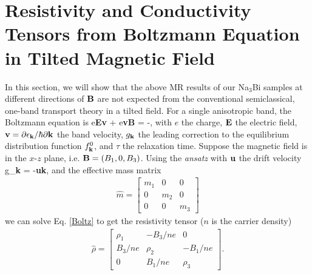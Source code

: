 \chapter{Resistivity and Conductivity Tensors from Boltzmann Equation in Tilted Magnetic Field\label{ch:Boltzmann}}

In this section, we will show that the above MR results of our Na$_3$Bi samples at different directions of $\bf B$ are not expected from the conventional semiclassical, one-band transport theory in a tilted field. For a single anisotropic band, the Boltzmann equation is
\be
e{\bf E\cdot v} + e{\bf v\times B}\cdot{} 
= -,
\label{Boltz}
\ee
with $e$ the charge, $\bf E$ the electric field, $\bf v = \partial\epsilon_{\bf k}/\hbar\partial {\bf k}$ the band velocity, $g_{\bf k}$ the leading correction to the equilibrium distribution function $f^0_{\bf k}$, and $\tau$ the relaxation time. Suppose the magnetic field is in the $x$-$z$ plane, i.e. ${\bf B} = (B_1, 0, B_3)$. Using the \emph{ansatz} with $\bf u$ the drift velocity
\be
g_{\bf k} = -{\bf u\cdot k},
\ee
and the effective mass matrix
\begin{eqnarray}
\hat{m} = \left[   \begin{array}{ccc}
		m_1   &   0   &   0 \\
		0      &    m_2 &   0 \\
		0     &    0     &   m_3   \end{array}\right]
\end{eqnarray}
we can solve Eq. \ref{Boltz} to get the resistivity tensor ($n$ is the carrier density)
\begin{eqnarray}
\hat{\rho} = 
						\left[  	\begin{array}{ccc}
								\rho_1	&  -B_3/ne   &   0  \\
								B_3/ne  &   \rho_2   &   -B_1/ne \\
								0          &   B_1/ne   &   \rho_3   
								\end{array}
								\right].
				\label{rhoij}
				\end{eqnarray}
				


